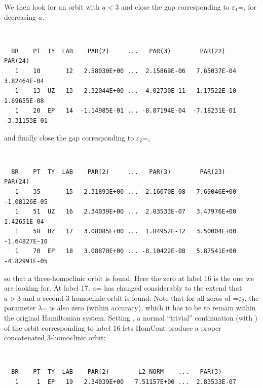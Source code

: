 \documentclass[12pt]{report}
\begin{document}
We then look for an orbit with $a<3$ and close the gap corresponding 
to $\varepsilon_1$=, for decreasing $a$.
\begin{center}
\\
\end{center}
\begin{verbatim}
  BR    PT  TY  LAB    PAR(2)     ...   PAR(3)        PAR(22)       PAR(24)
   1    10       12   2.58030E+00 ...  2.15869E-06   7.65037E-04   3.82464E-04
   1    13  UZ   13   2.32044E+00 ...  4.02730E-11   1.17522E-10   1.69655E-08
   1    20  EP   14  -1.14985E-01 ... -8.87194E-04  -7.18231E-01  -3.31153E-01
\end{verbatim}
and finally close the gap corresponding to $\varepsilon_2$=,
\begin{center}
\\
\end{center}
\begin{verbatim}
  BR    PT  TY  LAB    PAR(2)     ...   PAR(3)        PAR(23)       PAR(24)
   1    35       15   2.31893E+00 ... -2.16070E-08   7.69046E+00  -1.08126E-05
   1    51  UZ   16   2.34039E+00 ...  2.83533E-07   3.47976E+00   1.42651E-04
   1    58  UZ   17   3.08085E+00 ...  1.84952E-12   3.50004E+00  -1.64827E-10
   1    70  EP   18   3.08870E+00 ... -8.10422E-08   5.87541E+00  -4.82991E-05
\end{verbatim}
so that a three-homoclinic orbit is found. Here the zero at label
16 is the one we are looking for. At label 17, $a$= 
has changed
considerably to the extend that $a>3$ and a second 3-homoclinic orbit 
is found. Note that for all zeros of =$\varepsilon_2$, the
parameter $\lambda$= is also zero (within \AUTO accuracy), 
which it has to be to remain
within the original Hamiltonian system.
Setting , a normal ``trivial'' continuation (with )
of the orbit corresponding to label 16
lets {\cal HomCont} produce a proper concatenated
3-homoclinic orbit:
\begin{center}
\\
\end{center}
\begin{verbatim}
  BR    PT  TY  LAB    PAR(2)        L2-NORM    ...   PAR(3)     
   1     1  EP   19   2.34039E+00   7.51157E+00 ...  2.83533E-07
\end{verbatim}
\end{document}
